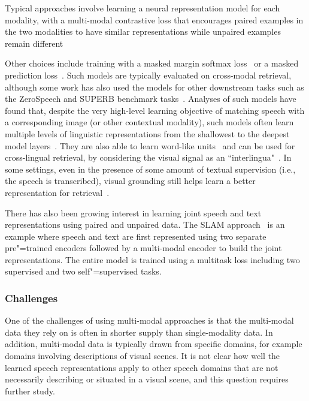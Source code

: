 Typical approaches involve learning a neural representation model for each modality, with a multi-modal contrastive loss that encourages paired examples in the two modalities to have similar representations while unpaired examples remain different~\parencite{synnaeve_learning_2014,harwath_unsupervised_2016,harwath_deep_2015,merkx_language_2019,rouditchenko_avlnet_2021,peng_fastslow_2022}

Other choices include training with a masked margin softmax loss~\parencite{ilharco_largescale_2019,sanabria_talk_2021} or a masked prediction loss~\parencite{chan_multimodal_2022}.  Such models are typically evaluated on cross-modal retrieval, although some work has also used the models for other downstream tasks such as the ZeroSpeech and SUPERB benchmark tasks~\parencite{peng_selfsupervised_2022}. 
Analyses of such models have found that, despite the very high-level learning objective of matching speech with a corresponding image (or other contextual modality), such models often learn multiple levels of linguistic representations from the shallowest to the deepest model layers~\parencite{harwath_learning_2019,chrupala_representations_2017,scharenborg_linguistic_2018}.  They are also able to learn word-like units~\parencite{harwath_jointly_2018,peng_word_2022,wang_dnnhmmdnn_2020} and can be used for cross-lingual retrieval, by considering the visual signal as an ``interlingua"~\parencite{harwath_vision_2018,havard_models_2019,kamper_visually_2018}. 
In some settings, even in the presence of some amount of textual supervision (i.e., the speech is transcribed), visual grounding still helps learn a better representation for retrieval~\parencite{pasad_contributions_2019}. 

There has also been growing interest in learning joint speech and text representations using paired and unpaired data. The SLAM approach~\parencite{bapna_slam_2021} is an example where speech and text are first represented using two separate pre"=trained encoders followed by a multi-modal encoder to build the joint representations. The entire model is trained using a multitask loss including two supervised and two self"=supervised tasks. 

\subsubsection{Challenges}
One of the challenges of using multi-modal approaches is that the multi-modal data they rely on is often in shorter supply than single-modality data. In addition, multi-modal data is typically drawn from specific domains, for example domains involving descriptions of visual scenes. It is not clear how well the learned speech representations apply to other speech domains that are not necessarily describing or situated in a visual scene, and this question requires further study.

